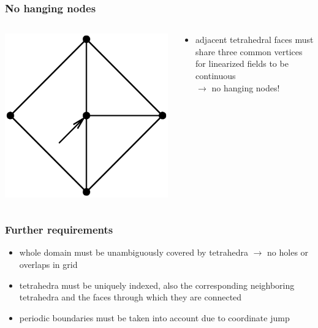 \documentclass{beamer}
\begin{document}
\begin{frame}
\frametitle{No hanging nodes}
\begin{columns}[onlytextwidth]
	\begin{column}{0.45\textwidth}
		\begin{center}
\centering \includegraphics[trim={4 0 0 0.5cm},clip,width=1\textwidth]{FIGURES/HangingNode.eps}
\end{center}
\end{column}
	\begin{column}{0.55\textwidth}
	\begin{center}
				\begin{itemize}
			\item adjacent tetrahedral faces must share three common vertices for linearized fields to be continuous\\
			$\rightarrow$ no hanging nodes!
		\end{itemize}
	\end{center}
\end{column}
\end{columns}
\end{frame}

\begin{frame}
\frametitle{Further requirements}
\begin{itemize}
	\item whole domain must be unambiguously covered by tetrahedra $\rightarrow$ no holes or overlaps in grid
	\item tetrahedra must be uniquely indexed, also the corresponding neighboring tetrahedra and the faces through which they are connected
	\item periodic boundaries must be taken into account due to coordinate jump
\end{itemize}
\end{frame}
\end{document}
